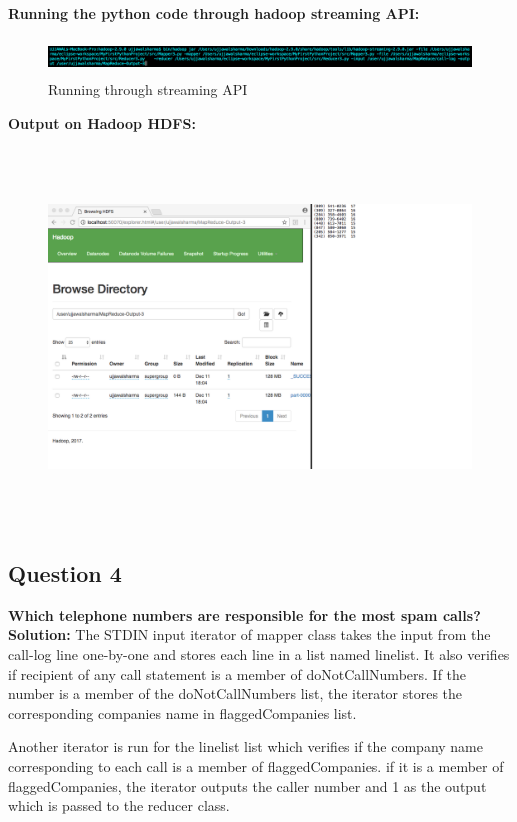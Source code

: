 \documentclass[a4paper, 10pt]{article}
\begin{document}
\noindent
\textbf{Running the python code through hadoop streaming API:}
\begin{figure}[!htbp]
    \centering
    \includegraphics[height=1cm]{Run3.png}
    \caption{Running through streaming API}
\end{figure}

\newpage
\noindent
\textbf{Output on Hadoop HDFS:}
\begin{figure}[!htbp]
    \centering
    \includegraphics[height=10cm]{Hadoop3.png}
\end{figure}

\subsection{Question 4}
\textbf{Which telephone numbers are responsible for the most spam calls?}\\
\noindent
\textbf{Solution:}
The STDIN input iterator of mapper class takes the input from the call-log line one-by-one and stores each line in a list named linelist. It also verifies if recipient of any call statement is a member of doNotCallNumbers. If the number is a member of the doNotCallNumbers list, the iterator stores the corresponding companies name in flaggedCompanies list.

Another iterator is run for the linelist list which verifies if the company name corresponding to each call is a member of flaggedCompanies. if it is a member of flaggedCompanies, the iterator outputs the caller number and 1 as the output which is passed to the reducer class. 
\end{document}

